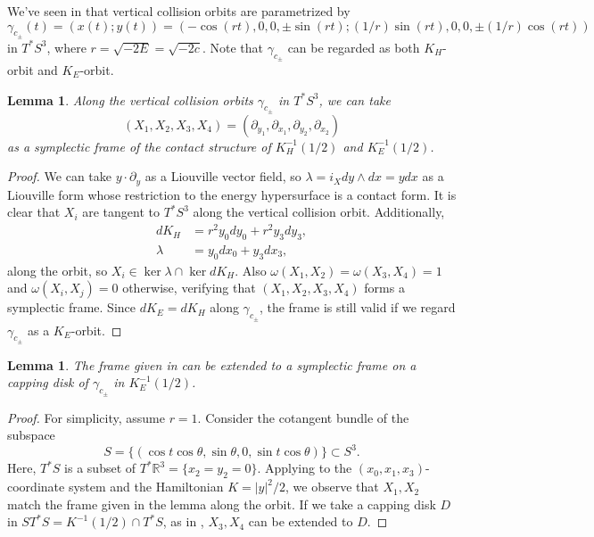 \documentclass{amsart}
\newcommand{\R}{\mathbb{R}}
\renewcommand{\o}{\omega}
\newcommand{\ld}{\lambda}
\newcommand{\g}{\gamma}
\newcommand{\w}{\wedge}
\newcommand{\pp}{\partial}
\newtheorem{lmm}[thm]{Lemma}
\begin{document}
We've seen in  that vertical collision orbits are parametrized by
$$
	\g_{c_\pm}(t) = (x(t);y(t)) = (-\cos (rt), 0, 0, \pm\sin(rt); (1/r)\sin(rt),0,0,\pm(1/r)\cos(rt))
$$
in $T^*S^3$, where $r=\sqrt{-2E}=\sqrt{-2c}$.
Note that $\g_{c_\pm}$ can be regarded as both $K_H$-orbit and $K_E$-orbit.

\begin{lmm}\label{Lemma - Vertical Frame}
	Along the vertical collision orbits $\g_{c_\pm}$ in $T^*S^3$, we can take
	$$
	(X_1,X_2,X_3,X_4)=(\pp_{y_1},\pp_{x_1},\pp_{y_2},\pp_{x_2})
	$$
	as a symplectic frame of the contact structure of $K_H^{-1}(1/2)$ and $K_E^{-1}(1/2)$.
\end{lmm}
\begin{proof}
	We can take $y\cdot \pp_y$ as a Liouville vector field, so $\lambda=i_X dy\w dx=ydx$ as a Liouville form whose restriction to the energy hypersurface is a contact form.
	It is clear that $X_i$ are tangent to $T^*S^3$ along the vertical collision orbit.
	Additionally,
	$$
	\begin{aligned}
		dK_H &= r^2 y_0 dy_0 + r^2 y_3 dy_3,\\
		\lambda &= y_0 dx_0 + y_3 dx_3,
	\end{aligned}
	$$
	along the orbit, so $X_i\in \ker \ld \cap \ker dK_H$.
	Also $\o(X_1,X_2)=\o(X_3,X_4)=1$ and $\o(X_i,X_j)=0$ otherwise, verifying that $(X_1,X_2,X_3,X_4)$ forms a symplectic frame.
	Since $dK_E=dK_H$ along $\g_{c_\pm}$, the frame is still valid if we regard $\g_{c_\pm}$ as a $K_E$-orbit.
\end{proof}
\begin{lmm}\label{Lemma - Vertical Frame 2}
	The frame given in  can be extended to a symplectic frame on a capping disk of $\g_{c_\pm}$ in $K_E^{-1}(1/2)$.
\end{lmm}
\begin{proof}
	For simplicity, assume $r=1$.
	Consider the cotangent bundle of the subspace
	$$
	S = \{(\cos t \cos \theta,\sin\theta,0,\sin t\cos\theta)\}\subset S^3.
	$$
	Here, $T^*S$ is a subset of $T^*\R^3 = \{x_2=y_2=0\}$.
	Applying  to the $(x_0,x_1,x_3)$-coordinate system and the Hamiltonian $K=|y|^2/2$, we observe that $X_1,X_2$ match the frame given in the lemma along the orbit.
	If we take a capping disk $D$ in $ST^*S=K^{-1}(1/2)\cap T^*S$, as in , $X_3,X_4$ can be extended to $D$.
\end{proof}
\end{document}
